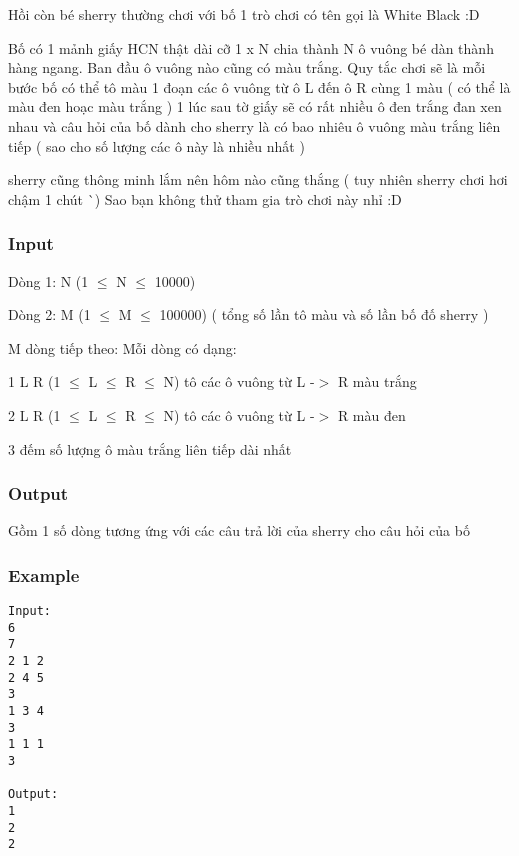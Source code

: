 



   Hồi còn bé sherry thường chơi với bố 1 trò chơi có tên gọi là White Black :D  

   Bố có 1 mảnh giấy HCN thật dài cỡ 1 x N chia thành N ô vuông bé dàn thành hàng ngang. Ban đầu ô vuông nào cũng có màu trắng. Quy tắc chơi sẽ là mỗi bước bố có thể tô màu 1 đoạn các ô vuông từ ô L đến ô R cùng 1 màu ( có thể là màu đen hoạc màu trắng ) 1 lúc sau tờ giấy sẽ có rất nhiều ô đen trắng đan xen nhau và câu hỏi của bố dành cho sherry là có bao nhiêu ô vuông màu trắng liên tiếp ( sao cho số lượng các ô này là nhiều nhất )  

   sherry cũng thông minh lắm nên hôm nào cũng thắng ( tuy nhiên sherry chơi hơi chậm 1 chút ^^ ) Sao bạn không thử tham gia trò chơi này nhỉ :D  

\subsubsection{   Input  }

   Dòng 1: N (1  $\le$  N  $\le$  10000)  

   Dòng 2: M (1  $\le$  M  $\le$  100000) ( tổng số lần tô màu và số lần bố đố sherry )  

   M dòng tiếp theo: Mỗi dòng có dạng:  

   1  L  R  (1  $\le$  L  $\le$  R  $\le$  N) tô các ô vuông từ L -$>$ R màu trắng  

   2  L  R  (1  $\le$  L  $\le$  R  $\le$  N) tô các ô vuông từ L -$>$ R màu đen  

   3 đếm số lượng ô màu trắng liên tiếp dài nhất  

\subsubsection{   Output  }

   Gồm 1 số dòng tương ứng với các câu trả lời của sherry cho câu hỏi của bố  

\subsubsection{   Example  }
\begin{verbatim}
Input:
6
7
2 1 2
2 4 5
3
1 3 4
3
1 1 1
3

Output:
1
2
2
\end{verbatim}
